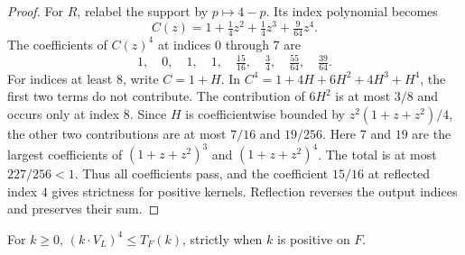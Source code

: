 \begin{proof}
For $R$, relabel the support by $p\mapsto4-p$. Its index polynomial becomes
\[
C(z)=1+\tfrac14z^2+\tfrac14z^3+\tfrac9{64}z^4.
\]
The coefficients of $C(z)^4$ at indices $0$ through $7$ are
\[
1,\quad0,\quad1,\quad1,\quad\tfrac{15}{16},\quad
\tfrac34,\quad\tfrac{55}{64},\quad\tfrac{39}{64}.
\]
For indices at least $8$, write $C=1+H$. In
$C^4=1+4H+6H^2+4H^3+H^4$, the first two terms do not contribute.
The contribution of $6H^2$ is at most $3/8$ and occurs only at index $8$.
Since $H$ is coefficientwise bounded by $z^2(1+z+z^2)/4$, the other
two contributions are at most $7/16$ and $19/256$. Here $7$ and $19$
are the largest coefficients of $(1+z+z^2)^3$ and $(1+z+z^2)^4$.
The total is at most $227/256<1$. Thus all coefficients pass, and the
coefficient $15/16$ at reflected index $4$ gives strictness for positive
kernels. Reflection reverses the output indices and preserves their sum.
\end{proof}

\begin{lemma}\label{d-VL-comparison}
For $k\geq0$, $(k\cdot V_L)^4\leq T_F(k)$, strictly when $k$ is positive
on $F$.
\end{lemma}

